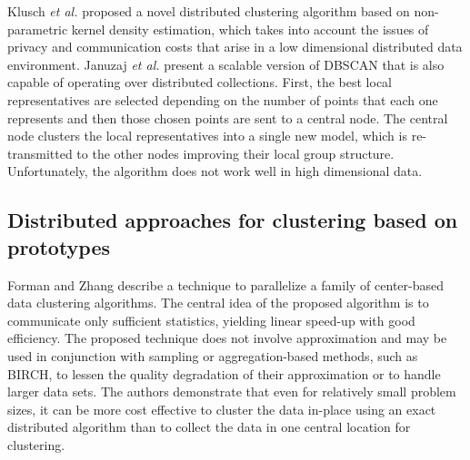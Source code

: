 \documentclass[10pt]{article}
\begin{document}
Klusch \textit{et al.} \citep{KLM03} proposed a novel distributed clustering algorithm based on non-parametric kernel density estimation, which takes into account the issues of privacy and communication costs that arise in a low dimensional distributed data environment. %
Januzaj \textit{et al.} \citep{JKP04} present a scalable version of DBSCAN that is also capable of operating over distributed collections. First, the best local representatives are selected depending on the number of points that each one represents and then those chosen points are sent to a central node. The central node clusters the local representatives into a single new model, which is re-transmitted to the other nodes improving their local group structure. Unfortunately, the algorithm does not work well in high dimensional data. 



\subsection{Distributed approaches for clustering based on prototypes}\label{sec:sa_prot}

Forman and Zhang \citep{FZ00} describe a technique to parallelize a family of center-based data clustering algorithms. The central idea of the proposed algorithm is to communicate only sufficient statistics, yielding linear speed-up with good efficiency. The proposed technique does not involve approximation and may be used in conjunction with sampling or aggregation-based methods, such as BIRCH, to lessen the quality degradation of their approximation or to handle larger data sets. The authors demonstrate that even for relatively small problem sizes, it can be more cost effective to cluster the data in-place using an exact distributed algorithm than to collect the data in one central location for clustering.

\end{document}
